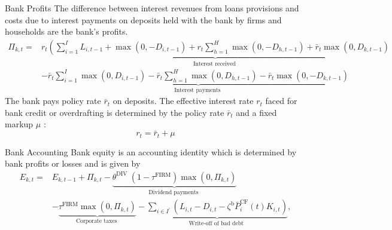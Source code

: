 \documentclass[9pt]{beamer}
\begin{document}
\begin{frame}{Bank Profits}
    The difference between interest revenues from loans provisions and costs due to interest payments on deposits held with the bank by firms and households are the bank's profits. 
\begin{equation}
    \begin{aligned}
\Pi_{k,t}= & \underbrace{r_t\left(\sum_{i=1}^I L_{i,t-1}+\max \left(0,-D_{i,t-1}\right)+r_t \sum_{h=1}^H \max \left(0,-D_{h,t-1}\right)+\bar{r}_t \max \left(0, D_{k,t-1}\right)\right.}_{\text {Interest received }} \\
& -\underbrace{\bar{r}_t \sum_{i=1}^I \max \left(0, D_{i,t-1}\right)-\bar{r}_t \sum_{h=1}^H \max \left(0, D_{h,t-1}\right)-\bar{r}_t \max \left(0,-D_{k,t-1}\right)}_{\text {Interest payments }}
\end{aligned}
\end{equation}
The bank pays policy rate $\bar{r}_t$ on deposits.   The effective interest rate $r_t$ faced for bank credit or overdrafting is determined by the policy rate $\bar{r}_t$ and a fixed markup $\mu$ :
\begin{equation}
    r_t=\bar{r}_t+\mu
\end{equation}
\hyperlink{ReturnOverview}{}

\end{frame}
\begin{frame}{Bank Accounting}
Bank equity is an accounting identity which is determined by bank profits or losses and is given by
    \begin{equation}
    \begin{aligned}
E_{k,t}= & E_{k,t-1}+\Pi_{k,t}-\underbrace{\theta^{\text {DIV }}\left(1-\tau^{\mathrm{FIRM}}\right) \max \left(0, \Pi_{k,t}\right)}_{\text {Dividend payments }} \\
& -\underbrace{\tau^{\mathrm{FIRM}} \max \left(0, \Pi_{k,t}\right)}_{\text {Corporate taxes }}-\underbrace{\sum_{i \in I^{\prime}}\left(L_{i,t}-D_{i,t}-\zeta^{\mathrm{b}} \bar{P}_i^{\mathrm{CF}}(t) K_{i,t}\right)}_{\text {Write-off of bad debt }},
\end{aligned}
\end{equation}
      \hyperlink{ReturnOverview}{}
\label{CentralBank}

\end{frame}
\end{document}
